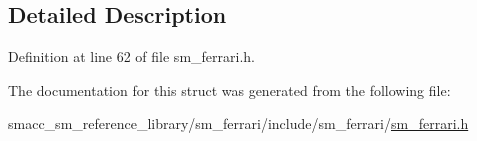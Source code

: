\subsection{Detailed Description}


Definition at line 62 of file sm\+\_\+ferrari.\+h.



The documentation for this struct was generated from the following file\+:\begin{DoxyCompactItemize}
\item 
smacc\+\_\+sm\+\_\+reference\+\_\+library/sm\+\_\+ferrari/include/sm\+\_\+ferrari/\hyperlink{sm__ferrari_8h}{sm\+\_\+ferrari.\+h}\end{DoxyCompactItemize}
